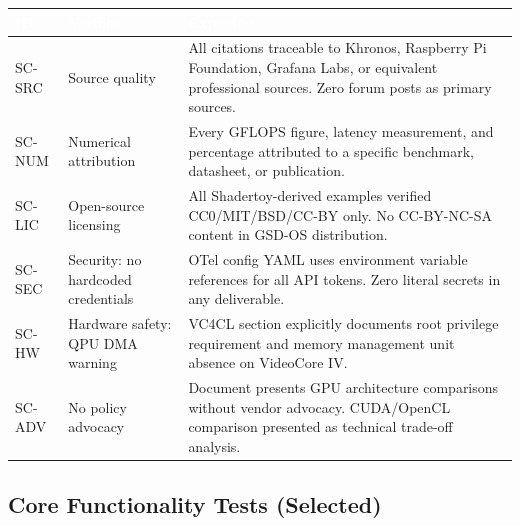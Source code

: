 \documentclass[11pt,letterpaper]{article}
\newcommand{\tableheader}[1]{\textbf{\sffamily\textcolor{white}{#1}}}
\begin{document}
\begin{center}
\begin{tabularx}{\textwidth}{C{1.5cm}L{4cm}X}
\toprule
{}
\tableheader{ID} & \tableheader{Verifies} & \tableheader{Expected} \\
\midrule
SC-SRC & Source quality & All citations traceable to Khronos, Raspberry Pi Foundation, Grafana Labs, or equivalent professional sources. Zero forum posts as primary sources. \\
SC-NUM & Numerical attribution & Every GFLOPS figure, latency measurement, and percentage attributed to a specific benchmark, datasheet, or publication. \\
SC-LIC & Open-source licensing & All Shadertoy-derived examples verified CC0/MIT/BSD/CC-BY only. No CC-BY-NC-SA content in GSD-OS distribution. \\
SC-SEC & Security: no hardcoded credentials & OTel config YAML uses environment variable references for all API tokens. Zero literal secrets in any deliverable. \\
SC-HW & Hardware safety: QPU DMA warning & VC4CL section explicitly documents root privilege requirement and memory management unit absence on VideoCore IV. \\
SC-ADV & No policy advocacy & Document presents GPU architecture comparisons without vendor advocacy. CUDA/OpenCL comparison presented as technical trade-off analysis. \\
\bottomrule
\end{tabularx}
\end{center}

\subsection{Core Functionality Tests (Selected)}
\end{document}
